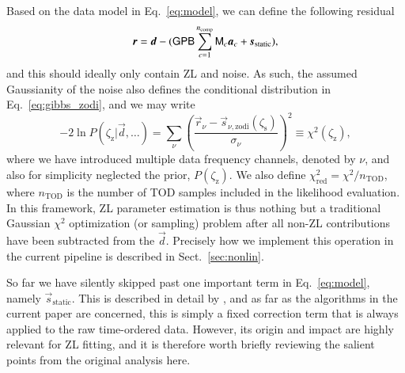 \documentclass[twocolumn]{aa}
\newcommand{\dv}[0]{\vec{d}}
\newcommand{\B}[0]{\tens{B}}
\newcommand{\G}[0]{\tens{G}}
\newcommand{\s}[0]{\vec{s}}
\renewcommand{\a}[0]{\vec{a}}
\newcommand{\M}[0]{\tens{M}}
\renewcommand{\r}[0]{\vec{r}}
\renewcommand{\P}[0]{\tens{P}}
\begin{document}
Based on the data model in Eq.~\ref{eq:model}, we can define the
following residual
\begin{equation}
\r = \dv - (\G\P\B\sum_{c=1}^{n_{\mathrm{comp}}}\M_c\a_c +
          \s_{\mathrm{static}}),
\end{equation}
and this should ideally only contain ZL and noise. As such, the
assumed Gaussianity of the noise also defines the conditional
distribution in Eq.~\eqref{eq:gibbs_zodi}, and we may write
\begin{equation}
  -2\ln P(\zeta_{\mathrm{z}}|\dv, \ldots) = \sum_{\nu}
  \left(\frac{\r_{\nu} -
    \s_{\nu,\mathrm{zodi}}(\zeta_\mathrm{s})}{\sigma_{\nu}}\right)^2 \equiv
  \chi^2 (\zeta_{\mathrm{z}}),
  \label{eq:gibbs_chisq}
\end{equation}
where we have introduced multiple data frequency channels, denoted by
$\nu$, and also for simplicity neglected the prior,
$P(\zeta_{\mathrm{z}})$. We also define
$\chi^2_{\mathrm{red}}=\chi^2/n_{\mathrm{TOD}}$, where
$n_{\mathrm{TOD}}$ is the number of TOD samples included in the
likelihood evaluation. In this framework, ZL parameter estimation is
thus nothing but a traditional Gaussian $\chi^2$ optimization (or
sampling) problem after all non-ZL contributions have been subtracted
from the $\dv$. Precisely how we implement this operation in the
current pipeline is described in Sect.~\ref{sec:nonlin}.

So far we have silently skipped past one important term in
Eq.~\eqref{eq:model}, namely $\s_{\mathrm{static}}$. This is described
in detail by \citet{CG02_01}, and as far as the algorithms in the
current paper are concerned, this is simply a fixed correction term
that is always applied to the raw time-ordered data. However, its
origin and impact are highly relevant for ZL fitting, and it is
therefore worth briefly reviewing the salient points from the original
analysis here.
\end{document}
